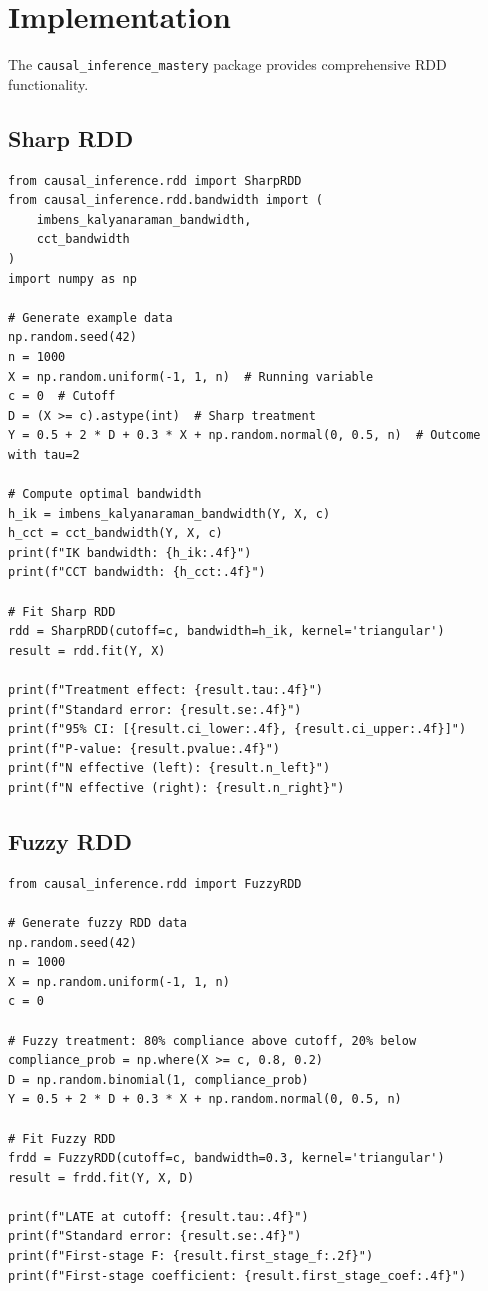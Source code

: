 \section{Implementation}
\label{sec:rdd_implementation}

The \texttt{causal\_inference\_mastery} package provides comprehensive RDD functionality.

\subsection{Sharp RDD}

\begin{verbatim}
from causal_inference.rdd import SharpRDD
from causal_inference.rdd.bandwidth import (
    imbens_kalyanaraman_bandwidth,
    cct_bandwidth
)
import numpy as np

# Generate example data
np.random.seed(42)
n = 1000
X = np.random.uniform(-1, 1, n)  # Running variable
c = 0  # Cutoff
D = (X >= c).astype(int)  # Sharp treatment
Y = 0.5 + 2 * D + 0.3 * X + np.random.normal(0, 0.5, n)  # Outcome with tau=2

# Compute optimal bandwidth
h_ik = imbens_kalyanaraman_bandwidth(Y, X, c)
h_cct = cct_bandwidth(Y, X, c)
print(f"IK bandwidth: {h_ik:.4f}")
print(f"CCT bandwidth: {h_cct:.4f}")

# Fit Sharp RDD
rdd = SharpRDD(cutoff=c, bandwidth=h_ik, kernel='triangular')
result = rdd.fit(Y, X)

print(f"Treatment effect: {result.tau:.4f}")
print(f"Standard error: {result.se:.4f}")
print(f"95% CI: [{result.ci_lower:.4f}, {result.ci_upper:.4f}]")
print(f"P-value: {result.pvalue:.4f}")
print(f"N effective (left): {result.n_left}")
print(f"N effective (right): {result.n_right}")
\end{verbatim}

\subsection{Fuzzy RDD}

\begin{verbatim}
from causal_inference.rdd import FuzzyRDD

# Generate fuzzy RDD data
np.random.seed(42)
n = 1000
X = np.random.uniform(-1, 1, n)
c = 0

# Fuzzy treatment: 80% compliance above cutoff, 20% below
compliance_prob = np.where(X >= c, 0.8, 0.2)
D = np.random.binomial(1, compliance_prob)
Y = 0.5 + 2 * D + 0.3 * X + np.random.normal(0, 0.5, n)

# Fit Fuzzy RDD
frdd = FuzzyRDD(cutoff=c, bandwidth=0.3, kernel='triangular')
result = frdd.fit(Y, X, D)

print(f"LATE at cutoff: {result.tau:.4f}")
print(f"Standard error: {result.se:.4f}")
print(f"First-stage F: {result.first_stage_f:.2f}")
print(f"First-stage coefficient: {result.first_stage_coef:.4f}")
\end{verbatim}

